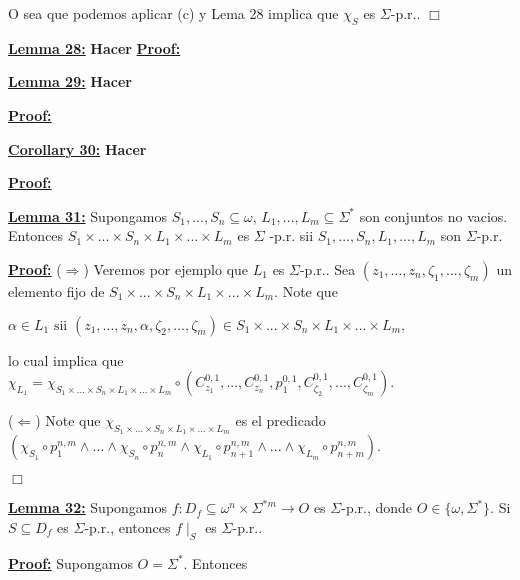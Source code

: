   O sea que podemos aplicar (c) y Lema 28 implica que \(\chi _{S}\) es \( \Sigma \)-p.r.. \(\Box\)


  \textbf{\underline{Lemma 28:}}
    \textbf{Hacer}
  \textbf{\underline{Proof:}}

  \textbf{\underline{Lemma 29:}}
    \textbf{Hacer}

  \textbf{\underline{Proof:}}

  \textbf{\underline{Corollary 30:}}
    \textbf{Hacer}

  \textbf{\underline{Proof:}}


  \textbf{\underline{Lemma 31:}} Supongamos \(S_{1},...,S_{n}\subseteq \omega \), \( L_{1},...,L_{m}\subseteq \Sigma ^{\ast }\) son conjuntos no vacios. Entonces \( S_{1}\times ...\times S_{n}\times L_{1}\times ...\times L_{m}\) es \(\Sigma \) -p.r. sii \(S_{1},...,S_{n},L_{1},...,L_{m}\) son \(\Sigma \)-p.r.

  \textbf{\underline{Proof:}} (\(\Rightarrow \)) Veremos por ejemplo que \(L_{1}\) es \(\Sigma \)-p.r.. Sea \( (z_{1},...,z_{n},\zeta _{1},...,\zeta _{m})\) un elemento fijo de \( S_{1}\times ...\times S_{n}\times L_{1}\times ...\times L_{m}.\) Note que

  \(\displaystyle \alpha \in L_{1}\text{ sii }(z_{1},...,z_{n},\alpha ,\zeta _{2},...,\zeta _{m})\in S_{1}\times ...\times S_{n}\times L_{1}\times ...\times L_{m}, \)

  lo cual implica que
  \(\displaystyle \chi _{L_{1}}=\chi _{S_{1}\times ...\times S_{n}\times L_{1}\times ...\times L_{m}}\circ \left( C_{z_{1}}^{0,1},...,C_{z_{n}}^{0,1},p_{1}^{0,1},C_{\zeta _{2}}^{0,1},...,C_{\zeta _{m}}^{0,1}\right) . \)

  (\(\Leftarrow \)) Note que \(\chi _{S_{1}\times ...\times S_{n}\times L_{1}\times ...\times L_{m}}\) es el predicado
  \(\displaystyle \left( \chi _{S_{1}}\circ p_{1}^{n,m}\wedge ...\wedge \chi _{S_{n}}\circ p_{n}^{n,m}\wedge \chi _{L_{1}}\circ p_{n+1}^{n,m}\wedge ...\wedge \chi _{L_{m}}\circ p_{n+m}^{n,m}\right) . \)

  \(\Box\)


  \textbf{\underline{Lemma 32:}} Supongamos \(f:D_{f}\subseteq \omega ^{n}\times \Sigma ^{\ast m}\rightarrow O\) es \(\Sigma \)-p.r., donde \(O\in \{\omega ,\Sigma ^{\ast }\}.\) Si \(S\subseteq D_{f}\) es \(\Sigma \)-p.r., entonces \(f\mid _{S}\) es \(\Sigma \)-p.r..

  \textbf{\underline{Proof:}} Supongamos \(O=\Sigma ^{\ast }\). Entonces

